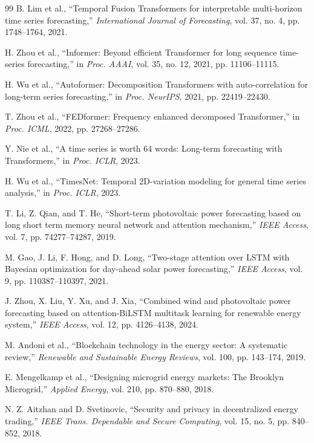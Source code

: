 \documentclass{ieeeaccess}
\begin{document}
\begin{thebibliography}{99}
B. Lim et al., ``Temporal Fusion Transformers for interpretable multi-horizon time series forecasting,'' \emph{International Journal of Forecasting}, vol. 37, no. 4, pp. 1748--1764, 2021.

H. Zhou et al., ``Informer: Beyond efficient Transformer for long sequence time-series forecasting,'' in \emph{Proc. AAAI}, vol. 35, no. 12, 2021, pp. 11106--11115.

H. Wu et al., ``Autoformer: Decomposition Transformers with auto-correlation for long-term series forecasting,'' in \emph{Proc. NeurIPS}, 2021, pp. 22419--22430.

T. Zhou et al., ``FEDformer: Frequency enhanced decomposed Transformer,'' in \emph{Proc. ICML}, 2022, pp. 27268--27286.

Y. Nie et al., ``A time series is worth 64 words: Long-term forecasting with Transformers,'' in \emph{Proc. ICLR}, 2023.

H. Wu et al., ``TimesNet: Temporal 2D-variation modeling for general time series analysis,'' in \emph{Proc. ICLR}, 2023.

T. Li, Z. Qian, and T. He, ``Short-term photovoltaic power forecasting based on long short term memory neural network and attention mechanism,'' \emph{IEEE Access}, vol. 7, pp. 74277--74287, 2019.

M. Gao, J. Li, F. Hong, and D. Long, ``Two-stage attention over LSTM with Bayesian optimization for day-ahead solar power forecasting,'' \emph{IEEE Access}, vol. 9, pp. 110387--110397, 2021.

J. Zhou, X. Liu, Y. Xu, and J. Xia, ``Combined wind and photovoltaic power forecasting based on attention-BiLSTM multitask learning for renewable energy system,'' \emph{IEEE Access}, vol. 12, pp. 4126--4138, 2024.

M. Andoni et al., ``Blockchain technology in the energy sector: A systematic review,'' \emph{Renewable and Sustainable Energy Reviews}, vol. 100, pp. 143--174, 2019.

E. Mengelkamp et al., ``Designing microgrid energy markets: The Brooklyn Microgrid,'' \emph{Applied Energy}, vol. 210, pp. 870--880, 2018.

N. Z. Aitzhan and D. Svetinovic, ``Security and privacy in decentralized energy trading,'' \emph{IEEE Trans. Dependable and Secure Computing}, vol. 15, no. 5, pp. 840--852, 2018.


\end{thebibliography}
\end{document}
